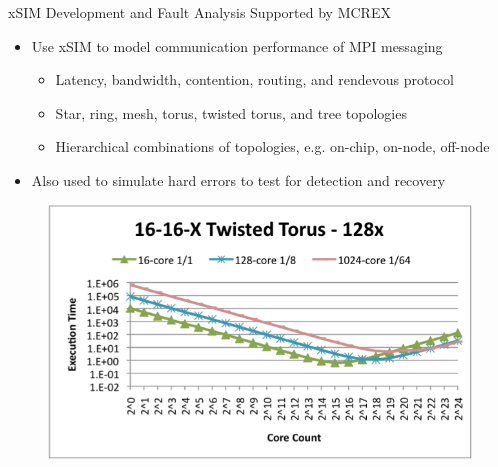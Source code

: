 \documentclass{beamer}
\begin{document}

\begin{frame}{xSIM Development and Fault Analysis Supported by MCREX}

  \begin{itemize}
  \item Use xSIM to model communication performance of MPI messaging
    \begin{itemize}
    \item Latency, bandwidth, contention, routing, and rendevous protocol
    \item Star, ring, mesh, torus, twisted torus, and tree topologies
    \item Hierarchical combinations of topologies, e.g. on-chip, on-node,
      off-node
    \end{itemize}
  \item Also used to simulate hard errors to test for detection and recovery
  \end{itemize}
  \vfill
  \begin{figure}
    \centering
    \includegraphics[height=.4\textwidth]{xsim}
  \end{figure}

\end{frame}

\end{document}
